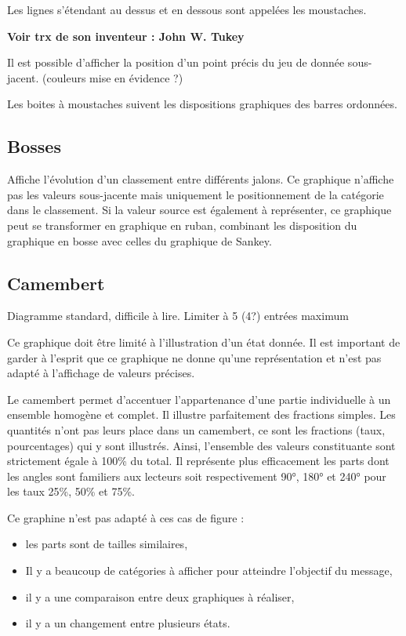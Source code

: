 \documentclass[a4paper,12pt]{article}
\begin{document}
\begin{multicols}{2}
Les lignes s'étendant au dessus et en dessous sont appelées les moustaches. \autocite{wilkeVisualizingManyDistributions2019}

\textbf{Voir trx de son inventeur : John W. Tukey}

Il est possible d'afficher la position d'un point précis du jeu de donnée sous-jacent. (couleurs mise en évidence ?)

Les boites à moustaches suivent les dispositions graphiques des barres ordonnées. \autocite{stephenfewComponentlevelGraphDesign2012}
\subsection*{Bosses}
\label{sec:org29c1726}
Affiche l'évolution d'un classement entre différents jalons. \autocite{mikeyiHowChooseRight2020,alansmithLexiqueVisuel}  Ce graphique n'affiche pas les valeurs sous-jacente mais uniquement le positionnement de la catégorie dans le classement. \autocite{jonathanschwabishTime2021} Si la valeur source est également à représenter, ce graphique peut se transformer en graphique en ruban, combinant les disposition du graphique en bosse avec celles du graphique de Sankey. \autocite{jonathanschwabishTime2021}
\subsection*{Camembert}
\label{sec:orge23c2fb}
Diagramme standard, difficile à lire. \autocite{alansmithLexiqueVisuel}
Limiter à 5 (4?) entrées maximum \autocite{mikeyiHowChooseRight2020}

Ce graphique doit être limité à l'illustration d'un état donnée. Il est important de garder à l'esprit que ce graphique ne donne qu'une représentation et n'est pas adapté à l'affichage de valeurs précises. \autocite{jonathanschwabishParttowhole2021}

Le camembert permet d'accentuer l'appartenance d'une partie individuelle à un ensemble homogène et complet. Il illustre parfaitement des fractions simples.\autocite{wilkeDirectoryVisualizations2019} Les quantités n'ont pas leurs place dans un camembert, ce sont les fractions (taux, pourcentages) qui y sont illustrés. Ainsi, l'ensemble des valeurs constituante sont strictement égale à 100\% du total.\autocite{wilkeVisualizingAmounts2019} Il représente plus efficacement les parts dont les angles sont familiers aux lecteurs soit respectivement 90°, 180° et 240° pour les taux 25\%, 50\% et 75\%.

Ce graphine n'est pas adapté à ces cas de figure :
\begin{itemize}
\item les parts sont de tailles similaires,\autocite{sosulskiGraphics2019}
\item Il y a beaucoup de catégories à afficher pour atteindre l'objectif du message,
\item il y a une comparaison entre deux graphiques à réaliser,\autocite{jonathanschwabishParttowhole2021}
\item il y a un changement entre plusieurs états.\autocite{wilkeDirectoryVisualizations2019}
\end{itemize}


\end{multicols}
\end{document}

